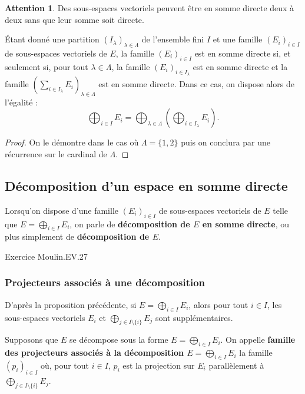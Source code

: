 \documentclass[french]{article}
\theoremstyle{plain}
\theoremstyle{definition}
\newtheorem*{attention}{Attention}
\theoremstyle{remark}
\begin{document}
\begin{attention}
	Des sous-espaces vectoriels peuvent être en somme directe deux à deux sans que leur somme soit directe.
\end{attention}

\begin{prop}%
	Étant donné une partition $(I_\lambda)_{\lambda\in\Lambda}$ de l'ensemble fini $I$ et une famille $(E_i)_{i\in I}$ de sous-espaces vectoriels de $E$, la famille $(E_i)_{i\in I}$ est en somme directe si, et seulement si, pour tout $\lambda\in\Lambda$, la famille $(E_i)_{i\in I_\lambda}$ est en somme directe et la famille $\displaystyle\left(\sum_{i\in I_\lambda} E_i\right)_{\lambda\in\Lambda}$ est en somme directe. Dans ce cas, on dispose alors de l'égalité : $$\bigoplus_{i\in I} E_i=\bigoplus_{\lambda\in\Lambda}\left(\bigoplus_{i\in I_\lambda}E_i\right).$$
\end{prop}
\begin{proof}
	On le démontre dans le cas où $\Lambda=\{1,2\}$ puis on conclura par une récurrence sur le cardinal de $\Lambda$.
\end{proof}

\subsection{Décomposition d'un espace en somme directe}

Lorsqu'on dispose d'une famille $(E_i)_{i\in I}$ de sous-espaces vectoriels de $E$ telle que $E=\displaystyle\bigoplus_{i\in I}E_i$, on parle de \textbf{décomposition de $E$ en somme directe}, ou plus simplement de \textbf{décomposition de $E$}.

Exercice Moulin.EV.27

\subsubsection*{Projecteurs associés à une décomposition}
D'après la proposition précédente, si $E=\displaystyle\bigoplus_{i\in I}E_i$, alors pour tout $i\in I$, les sous-espaces vectoriels $E_i$ et $\displaystyle\bigoplus_{j\in I\setminus\{i\}}E_j$ sont supplémentaires.
\begin{dfn}
	Supposons que $E$ se décompose sous la forme $E=\displaystyle\bigoplus_{i\in I}E_i$. On appelle \textbf{famille des projecteurs associés à la décomposition $E=\displaystyle\bigoplus_{i\in I}E_i$} la famille $(p_i)_{i\in I}$ où, pour tout $i\in I$, $p_i$ est la projection sur $E_i$ parallèlement à $\displaystyle\bigoplus_{j\in I\setminus\{i\}}E_j$.
\end{dfn}
\end{document}
